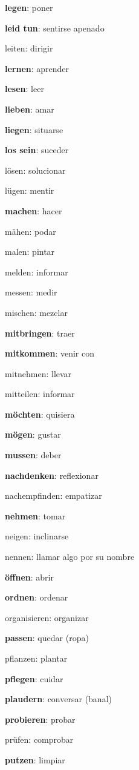 \begin{multicols}{2}
\begin{myitemize}
\item \textbf{legen}: poner
\item \textbf{leid tun}: sentirse apenado
\item leiten: dirigir
\item \textbf{lernen}: aprender
\item \textbf{lesen}: leer
\item \textbf{lieben}: amar
\item \textbf{liegen}: situarse
\item \textbf{los sein}: suceder
\item lösen: solucionar
\item lügen: mentir
\item \textbf{machen}: hacer
\item mähen: podar
\item malen: pintar
\item melden: informar
\item messen: medir
\item mischen: mezclar
\item \textbf{mitbringen}: traer
\item \textbf{mitkommen}: venir con
\item mitnehmen: llevar
\item mitteilen: informar
\item \textbf{möchten}: quisiera
\item \textbf{mögen}: gustar
\item \textbf{mussen}: deber
\item \textbf{nachdenken}: reflexionar
\item nachempfinden: empatizar
\item \textbf{nehmen}: tomar
\item neigen: inclinarse
\item nennen: llamar algo por su nombre
\item \textbf{öffnen}: abrir
\item \textbf{ordnen}: ordenar
\item organisieren: organizar
\item \textbf{passen}: quedar (ropa)
\item pflanzen: plantar
\item \textbf{pflegen}: cuidar
\item \textbf{plaudern}: conversar (banal)
\item \textbf{probieren}: probar
\item prüfen: comprobar
\item \textbf{putzen}: limpiar

\end{myitemize}
\end{multicols}
